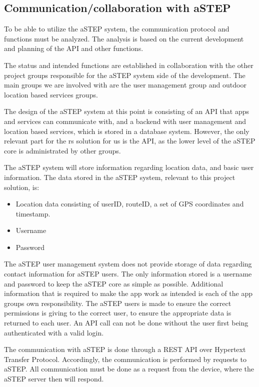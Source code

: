 \subsection{Communication/collaboration with aSTEP}
To be able to utilize the aSTEP system, the communication protocol and functions must be analyzed. 
The analysis is based on the current development and planning of the API and other functions.

The status and intended functions are established in collaboration with the other project groups responsible for the aSTEP system side of the development. 
The main groups we are involved with are the user management group and outdoor location based services groups.

The design of the aSTEP system at this point is consisting of an API that apps and services can communicate with, and a backend with user management and location based services, which is stored in a database system.
However, the only relevant part for the \gls{rs} solution for us is the API, as the lower level of the aSTEP core is administrated by other groups.

The aSTEP system will store information regarding location data, and basic user information. 
The data stored in the aSTEP system, relevant to this project solution, is:
\begin{itemize}
	\item Location data consisting of userID, routeID, a set of GPS coordinates and timestamp.
	\item Username
	\item Password
\end{itemize}

The aSTEP user management system does not provide storage of data regarding contact information for aSTEP users.
The only information stored is a username and password to keep the aSTEP core as simple as possible.
Additional information that is required to make the app work as intended is each of the app groups own responsibility.
The aSTEP users is made to ensure the correct permissions is giving to the correct user, to ensure the appropriate data is returned to each user.
An API call can not be done without the user first being authenticated with a valid login.

The communication with aSTEP is done through a REST API over Hypertext Transfer Protocol.
Accordingly, the communication is performed by requests to aSTEP.
All communication must be done as a request from the device, where the aSTEP server then will respond.


